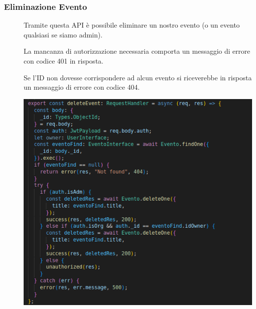 \documentclass{article}
\begin{document}
\subsubsection{Eliminazione Evento}
\begin{description}
    \item[] Tramite questa API è possibile eliminare un nostro evento (o un evento qualsiasi se siamo admin).
    \item[] La mancanza di autorizzazione necessaria comporta un messaggio di errore con codice 401 in risposta.
    \item[] Se l'ID non dovesse corrispondere ad alcun evento si riceverebbe in risposta un messaggio di errore con codice 404.
    \item[] \begin{center}
            \includegraphics[scale=0.5]{deleteEvent.png}
        \end{center}
\end{description}
\clearpage
\end{document}
